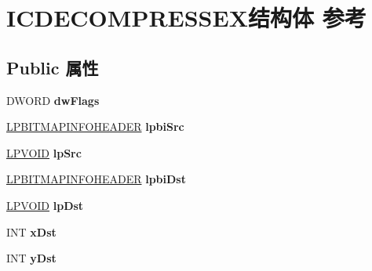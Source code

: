 \hypertarget{struct_i_c_d_e_c_o_m_p_r_e_s_s_e_x}{}\section{I\+C\+D\+E\+C\+O\+M\+P\+R\+E\+S\+S\+E\+X结构体 参考}
\label{struct_i_c_d_e_c_o_m_p_r_e_s_s_e_x}
\subsection*{Public 属性}
\begin{DoxyCompactItemize}
\item 
\mbox{\label{struct_i_c_d_e_c_o_m_p_r_e_s_s_e_x_ae46ce99628475280819350cea8d4b1de}} 
D\+W\+O\+RD {\bfseries dw\+Flags}
\item 
\mbox{\label{struct_i_c_d_e_c_o_m_p_r_e_s_s_e_x_a1bc14a7ad6638297db105cc522bbc050}} 
\hyperlink{struct_b_i_t_m_a_p_i_n_f_o_h_e_a_d_e_r}{L\+P\+B\+I\+T\+M\+A\+P\+I\+N\+F\+O\+H\+E\+A\+D\+ER} {\bfseries lpbi\+Src}
\item 
\mbox{\label{struct_i_c_d_e_c_o_m_p_r_e_s_s_e_x_a2bd9fc81717aa9fb86fd16ccc492c86e}} 
\hyperlink{interfacevoid}{L\+P\+V\+O\+ID} {\bfseries lp\+Src}
\item 
\mbox{\label{struct_i_c_d_e_c_o_m_p_r_e_s_s_e_x_a7b8d9828de148b89af8652c088178718}} 
\hyperlink{struct_b_i_t_m_a_p_i_n_f_o_h_e_a_d_e_r}{L\+P\+B\+I\+T\+M\+A\+P\+I\+N\+F\+O\+H\+E\+A\+D\+ER} {\bfseries lpbi\+Dst}
\item 
\mbox{\label{struct_i_c_d_e_c_o_m_p_r_e_s_s_e_x_a2570cfd06cd572449dafeb4081042805}} 
\hyperlink{interfacevoid}{L\+P\+V\+O\+ID} {\bfseries lp\+Dst}
\item 
\mbox{\label{struct_i_c_d_e_c_o_m_p_r_e_s_s_e_x_ac9a2d4f7b29ffa02bf54fd1df5efa246}} 
I\+NT {\bfseries x\+Dst}
\item 
\mbox{\label{struct_i_c_d_e_c_o_m_p_r_e_s_s_e_x_a139307b5f03d812459e8e129f6bb7f16}} 
I\+NT {\bfseries y\+Dst}

\end{DoxyCompactItemize}
